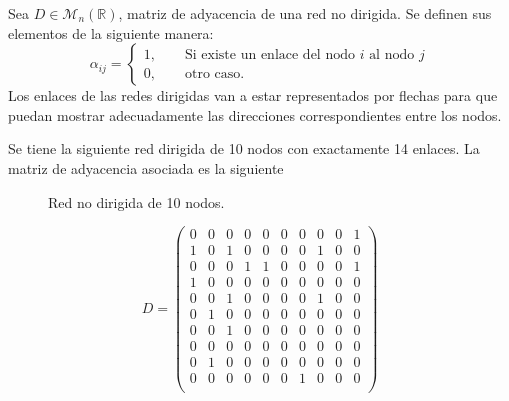 \begin{definición}
	Sea $D\in\mathcal{M}_n(\mathbb{R})$, matriz de adyacencia de una red no dirigida. Se definen sus elementos de la siguiente manera:
	$$
	\alpha_{ij}=\begin{cases}
		1,\qquad\text{Si existe un enlace del nodo $i$ al nodo $j$}\\
		0,\qquad\text{otro caso.}
	\end{cases}
	$$
	Los enlaces de las redes dirigidas van a estar representados por flechas para que puedan mostrar adecuadamente las direcciones correspondientes entre los nodos. 
\end{definición}

\begin{ejemplo}
	Se tiene la siguiente red dirigida de 10 nodos con exactamente 14 enlaces. La matriz de adyacencia asociada es la siguiente
\end{ejemplo}

\begin{figure} \vspace{-30pt} \begin{center}
		 
	\end{center} 
	\vspace{-20pt} 
	\caption{Red no dirigida de 10 nodos.} 
	\vspace{-150pt}
	\label{fig:Red10Dir}
\end{figure} 
$$
D = \begin{pmatrix}
	0 & 0 & 0 & 0 & 0 & 0 & 0 & 0 & 0 & 1 \\
	1 & 0 & 1 & 0 & 0 & 0 & 0 & 1 & 0 & 0 \\
	0 & 0 & 0 & 1 & 1 & 0 & 0 & 0 & 0 & 1 \\
	1 & 0 & 0 & 0 & 0 & 0 & 0 & 0 & 0 & 0 \\
	0 & 0 & 1 & 0 & 0 & 0 & 0 & 1 & 0 & 0 \\
	0 & 1 & 0 & 0 & 0 & 0 & 0 & 0 & 0 & 0 \\
	0 & 0 & 1 & 0 & 0 & 0 & 0 & 0 & 0 & 0 \\
	0 & 0 & 0 & 0 & 0 & 0 & 0 & 0 & 0 & 0 \\
	0 & 1 & 0 & 0 & 0 & 0 & 0 & 0 & 0 & 0 \\
	0 & 0 & 0 & 0 & 0 & 0 & 1 & 0 & 0 & 0 \\
\end{pmatrix}
$$


